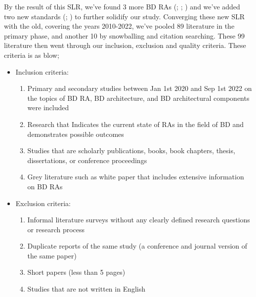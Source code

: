 \documentclass[review]{elsarticle}
\begin{document}
\begin{enumerate}
    By the result of this SLR, we've found 3 more BD RAs (\cite{AtaeiApsec}; \cite{castellanos2021smart}; \cite{sang2017simplifying}) and we've added two new standards (\cite{ISO20546}; \cite{ISO20547}) to further solidify our study. Converging these new SLR with the old, covering the years 2010-2022, we've pooled 89 literature in the primary phase, and another 10 by snowballing and citation searching. These 99 literature then went through our inclusion, exclusion and quality criteria. These criteria is as blow;

    \begin{itemize}
        \item Inclusion criteria:
        \begin{enumerate}
            \item Primary and secondary studies between Jan 1st 2020 and Sep 1st 2022 on the topics of BD RA, BD architecture, and BD architectural components were included
            \item Research that Indicates the current state of RAs in the field of BD and demonstrates possible outcomes
            \item Studies that are scholarly publications, books, book chapters, thesis, dissertations, or conference proceedings 
            \item Grey literature such as white paper that includes extensive information on BD RAs
        \end{enumerate}
        \item Exclusion criteria:
        \begin{enumerate}
            \item Informal literature surveys without any clearly defined research questions or research process
            \item Duplicate reports of the same study (a conference and journal version of the same paper)
            \item Short papers (less than 5 pages)
            \item Studies that are not written in English
        \end{enumerate}
    \end{itemize}
\end{enumerate}



\end{document}
